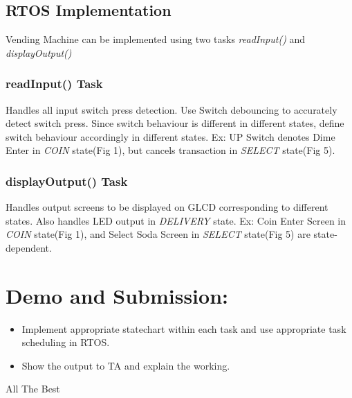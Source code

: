 \documentclass{article}
\begin{document}
 \subsection{RTOS Implementation}
 \qquad Vending Machine can be implemented using two tasks \textit{readInput()} and \textit{displayOutput()}
 \subsubsection{readInput() Task}
 \qquad Handles all input switch press detection. Use Switch debouncing to accurately detect switch press. Since switch behaviour is different in different states, define switch behaviour accordingly in different states. Ex: UP Switch denotes Dime Enter in \textit{COIN} state(Fig 1), but cancels transaction in \textit{SELECT} state(Fig 5).
 \subsubsection{displayOutput() Task}
 \qquad Handles output screens to be displayed on GLCD corresponding to different states. Also handles LED output in \textit{DELIVERY} state. Ex: Coin Enter Screen in \textit{COIN} state(Fig 1), and Select Soda Screen in \textit{SELECT} state(Fig 5) are state-dependent.
\section{Demo and Submission:}
\begin{itemize}
    \item Implement appropriate statechart within each task and use appropriate task scheduling in RTOS.
    \item Show the output to TA and explain the working.
\end{itemize}
\begin{center}
\newline
   All The Best

 \end{center}
\end{document}
